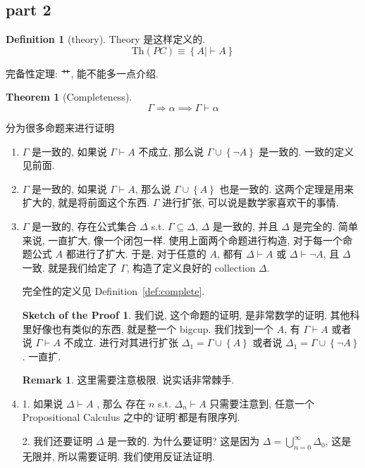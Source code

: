 \documentclass[12pt, a4paper]{ctexart} %
\theoremstyle{plain}
\newtheorem{theorem}{Theorem}[section]
\theoremstyle{definition}
\newtheorem{definition}{Definition}[section]
\newtheorem*{remark}{Remark}
\newtheorem*{comment}{Comment}
\newtheorem*{sketchoftheproof}{Sketch of the Proof}
\begin{document}
\subsection{part 2}
\begin{definition}[theory]
    Theory 是这样定义的. 
    \begin{equation}
    \text{Th}\left(PC\right)\equiv \left\{ A \mid \vdash A\right\}
    \end{equation}
\end{definition}

完备性定理: 艹, 能不能多一点介绍.
\begin{theorem}[Completeness]
    \begin{equation}
        \Gamma \Rightarrow \alpha \implies \Gamma \vdash \alpha
    \end{equation}
\end{theorem}
分为很多命题来进行证明 

\begin{enumerate}
\item $\Gamma$ 是一致的, 如果说 $\Gamma \vdash A$ 不成立, 那么说 $\Gamma \cup  \left\{\neg A\right\}$ 是一致的. 一致的定义见前面.
\item $\Gamma$ 是一致的, 如果说 $\Gamma \vdash  A$, 那么说 $\Gamma \cup \left\{A\right\}$ 也是一致的. 这两个定理是用来扩大的, 就是将前面这个东西. $\Gamma$ 进行扩张, 可以说是数学家喜欢干的事情. 
\item $\Gamma $ 是一致的, 存在公式集合 $\Delta $ s.t. $\Gamma \subseteq \Delta$, $\Delta$ 是一致的, 并且 $\Delta$ 是完全的. 简单来说, 一直扩大, 像一个闭包一样. 使用上面两个命题进行构造, 对于每一个命题公式 $A$ 都进行了扩大. 于是, 对于任意的 $A$, 都有 $\Delta \vdash A$ 或 $\Delta \vdash \neg A$, 且 $\Delta $ 一致. 就是我们给定了 $\Gamma $, 构造了定义良好的 collection $\Delta$. 

完全性的定义见 Definition~\ref{def:complete}. 
\begin{sketchoftheproof}我们说, 这个命题的证明, 是非常数学的证明, 其他科里好像也有类似的东西, 就是整一个 bigcup. 
    我们找到一个 $A$, 有 $\Gamma \vdash  A$ 或者说 $\Gamma \vdash A$ 不成立. 进行对其进行扩张 $\Delta _{1} = \Gamma \cup  \left\{ A\right\} $ 或者说 $\Delta _{1}  = \Gamma \cup  \left\{ \neg A\right\} $. 一直扩.
\end{sketchoftheproof}
\begin{remark}
这里需要注意极限. 说实话非常棘手.
\end{remark}
\item 1. 如果说 $\Delta \vdash  A$ , 那么 存在 $n$ s.t. $\Delta _{n} \vdash A$
只需要注意到, 任意一个 Propositional Calculus 之中的`证明'都是有限序列.

2. 我们还要证明 $\Delta $ 是一致的. 为什么要证明? 这是因为 $\Delta = \bigcup^{\infty}_{n=0} \Delta _{0}$, 这是无限并, 所以需要证明. 我们使用反证法证明. 
\end{enumerate}
\begin{comment}
    这里就不讲了, 哈哈, 考试不考, 这样一说谁都不看了. 当然啦, 这个东西是整个 Propositional Calculus 之中最重要的东西. 乐. 
\end{comment}
\end{document}
